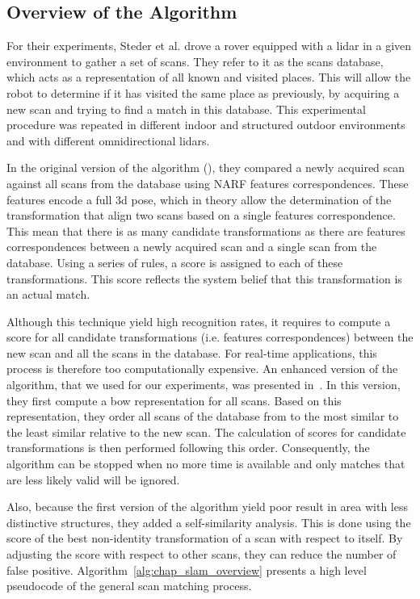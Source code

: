 \subsection{Overview of the Algorithm}
\label{ssec:chap_slam_algo}

For their experiments, Steder et al. drove a rover equipped with a \gls*{lidar} in a given environment to gather a set of scans. They refer to it as the scans database, which acts as a representation of all known and visited places. This will allow the robot to determine if it has visited the same place as previously, by acquiring a new scan and trying to find a match in this database. This experimental procedure was repeated in different indoor and structured outdoor environments and with different omnidirectional \gls*{lidar}s.

In the original version of the algorithm (\cite{Steder2010}), they compared a newly acquired scan against all scans from the database using NARF features correspondences. These features encode a full \gls*{3d} pose, which in theory allow the determination of the transformation that align two scans based on a single features correspondence. This mean that there is as many candidate transformations as there are features correspondences between a newly acquired scan and a single scan from the database. Using a series of rules, a score is assigned to each of these transformations. This score reflects the system belief that this transformation is an actual match.

Although this technique yield high recognition rates, it requires to compute a score for all candidate transformations (i.e. features correspondences) between the new scan and all the scans in the database. For real-time applications, this process is therefore too computationally expensive. An enhanced version of the algorithm, that we used for our experiments, was presented in~\cite{Steder2011b}. In this version, they first compute a \gls*{bow} representation for all scans. Based on this representation, they order all scans of the database from to the most similar to the least similar relative to the new scan. The calculation of scores for candidate transformations is then performed following this order. Consequently, the algorithm can be stopped when no more time is available and only matches that are less likely valid will be ignored. 

Also, because the first version of the algorithm yield poor result in area with less distinctive structures, they added a self-similarity analysis. This is done using the score of the best non-identity transformation of a scan with respect to itself. By adjusting the score with respect to other scans, they can reduce the number of false positive. Algorithm~\ref{alg:chap_slam_overview} presents a high level pseudocode of the general scan matching process.

